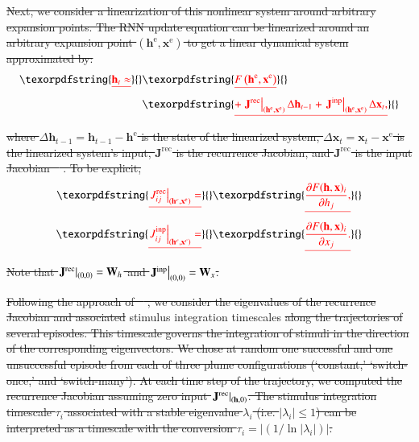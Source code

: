\documentclass[5p,twocolumn,authoryear]{elsarticle}
\providecommand{\DIFaddtex}[1]{{\protect\color{blue}\uwave{#1}}} %
\providecommand{\DIFdeltex}[1]{{\protect\color{red}\sout{#1}}}                      %
\providecommand{\DIFaddbegin}{} %
\providecommand{\DIFaddend}{} %
\providecommand{\DIFdelbegin}{} %
\providecommand{\DIFdelend}{} %
\providecommand{\DIFadd}[1]{\texorpdfstring{\DIFaddtex{#1}}{#1}} %
\providecommand{\DIFdel}[1]{\texorpdfstring{\DIFdeltex{#1}}{}} %
\newcommand{\DIFscaledelfig}{0.5}
\newlength{\DIFdelgraphicswidth} %
\newlength{\DIFdelgraphicsheight} %
\newcommand{\DIFaddincludegraphics}[2][]{{\color{blue}\fbox{\DIFOincludegraphics[#1]{#2}}}} %
\newcommand{\DIFdelincludegraphics}[2][]{%
\sbox{\DIFdelgraphicsbox}{\DIFOincludegraphics[#1]{#2}}%
\settoboxwidth{\DIFdelgraphicswidth}{\DIFdelgraphicsbox} %
\settoboxtotalheight{\DIFdelgraphicsheight}{\DIFdelgraphicsbox} %
\scalebox{\DIFscaledelfig}{%
\parbox[b]{\DIFdelgraphicswidth}{\usebox{\DIFdelgraphicsbox}\\[-\baselineskip] \rule{\DIFdelgraphicswidth}{0em}}\llap{\resizebox{\DIFdelgraphicswidth}{\DIFdelgraphicsheight}{%
\setlength{\unitlength}{\DIFdelgraphicswidth}%
\begin{picture}(1,1)%
\thicklines\linethickness{2pt} %
{\color[rgb]{1,0,0}\put(0,0){\framebox(1,1){}}}%
{\color[rgb]{1,0,0}\put(0,0){\line( 1,1){1}}}%
{\color[rgb]{1,0,0}\put(0,1){\line(1,-1){1}}}%
\end{picture}%
}\hspace*{3pt}}} %
} %
\DeclareRobustCommand{\DIFaddbegin}{\DIFOaddbegin \let\includegraphics\DIFaddincludegraphics} %
\DeclareRobustCommand{\DIFaddend}{\DIFOaddend \let\includegraphics\DIFOincludegraphics} %
\DeclareRobustCommand{\DIFdelbegin}{\DIFOdelbegin \let\includegraphics\DIFdelincludegraphics} %
\DeclareRobustCommand{\DIFdelend}{\DIFOaddend \let\includegraphics\DIFOincludegraphics} %
\begin{document}
\DIFdelbegin \DIFdel{Next, we consider a linearization of this nonlinear system around arbitrary expansion points. 
The RNN update equation can be linearized around an arbitrary expansion point $\left(\mathbf{h}^{\mathrm{e}}, \mathbf{x}^{\mathrm{e}}\right)$ to get a linear dynamical system approximated by: 
}\begin{align*}
\DIFdel{\mathbf{h}_{t} \approx }& \DIFdel{F\left(\mathbf{h}^{\mathrm{e}}, \mathbf{x}^{\mathrm{e}}\right) }\\
&\DIFdel{+ \left.\mathbf{J}^{\mathrm{rec}}\right|_{\left(\mathbf{h}^{\mathrm{e}}, \mathbf{x}^{\mathrm{e}}\right)} \Delta \mathbf{h}_{t-1}+\left.\mathbf{J}^{\mathrm{inp}}\right|_{\left(\mathbf{h}^{\mathrm{e}}, \mathbf{x}^{\mathrm{e}}\right)} \Delta \mathbf{x}_{t},
}\end{align*}
\DIFdel{where $\Delta \mathbf{h}_{t-1}=\mathbf{h}_{t-1}-\mathbf{h}^{\mathrm{e}}$ is the state of the linearized system, 
\mbox{$\Delta \mathbf{x}_{t}=\mathbf{x}_{t}-\mathbf{x}^{\mathrm{e}}$} is the linearized system's input,
$\mathbf{J}^{\mathrm{rec}}$ is the recurrence Jacobian, and $\mathbf{J}^{\mathrm{rec}}$ is the input Jacobian \mbox{%
\citep{maheswaranathan2019reverse}}\hspace{0pt}%
.
To be explicit,
}\begin{align*}
\DIFdel{\left.J_{i j}^{\mathrm{rec}}\right|_{\left(\mathbf{h}^{\mathrm{}{e}}, \mathbf{x}^{\mathrm{e}}\right)} =}& \DIFdel{\frac{\partial F(\mathbf{h}, \mathbf{x})_{i}}{\partial h_{j}}, }\\ 
\DIFdel{\left.J_{i j}^{\mathrm{inp}}\right|_{\left(\mathbf{h}^{e}, \mathbf{x}^{e}\right)}=}&\DIFdel{\frac{\partial F(\mathbf{h}, \mathbf{x})_{i}}{\partial x_{j}}.
}\end{align*}
\DIFdel{Note that 
\mbox{$\left.\mathbf{J}^{\mathrm{rec}}\right|_{\left(0, 0\right)} = \mathbf{W}_h$} and
\mbox{$\left.\mathbf{J}^{\mathrm{inp}}\right|_{\left(0, 0\right)} = \mathbf{W}_x$}.
}%

\DIFdel{Following the approach of \mbox{%
\citep{maheswaranathan2019reverse}}\hspace{0pt}%
, we consider the eigenvalues of the recurrence Jacobian and associated }\DIFdelend \DIFaddbegin \DIFadd{Comparing the time-averaged }\DIFaddend stimulus integration timescales \DIFdelbegin \DIFdel{along the trajectories of several episodes.
This timescale governs the integration of stimuli in the direction of the corresponding eigenvectors.
We chose at random one successful and one unsuccessful episode from each of three plume configurations (`constant,' `switch-once,' and `switch-many').
At each time step of the trajectory, we computed the recurrence Jacobian assuming zero input $\left.\mathbf{J}^{\mathrm{rec}}\right|_{(\mathbf{h},0)}$.
The stimulus integration timescale $\tau_i$ associated with a stable eigenvalue $\lambda_i$ (i.e. $|\lambda_i| \leq 1$) can be interpreted as a timescale with the conversion \mbox{$\tau_i = \left| ( 1/ \ln|\lambda_i| ) \right|$}.
}%
\end{document}
